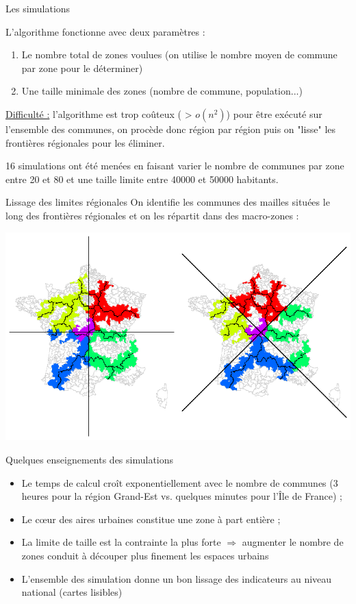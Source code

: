 \documentclass[11pt]{beamer}
\begin{document}
\begin{frame}{Les simulations}

L'algorithme fonctionne avec deux paramètres :
\begin{enumerate}
\item Le nombre total de zones voulues (on utilise le nombre moyen de commune par zone pour le déterminer)
\item Une taille minimale des zones (nombre de commune, population...)
\end{enumerate}
\vspace{.2cm}
\underline{Difficulté :} l'algorithme est trop coûteux ( > $o(n^2)$) pour être exécuté sur l'ensemble des communes, on procède donc région par région puis on "lisse" les frontières régionales pour les éliminer.

\vspace{.2cm}

16 simulations ont été menées en faisant varier le nombre de communes par zone entre 20 et 80 et une taille limite entre 40000 et 50000 habitants.
\end{frame}

\begin{frame}{Lissage des limites régionales}
On identifie les communes des mailles situées le long des frontières régionales et on les répartit dans des macro-zones :
\begin{center}
\includegraphics[scale=.5]{img/Methodo_decoupage}
\end{center}
\end{frame}


\begin{frame}{Quelques enseignements des simulations}
\begin{itemize}
\item Le temps de calcul croît exponentiellement avec le nombre de communes (3 heures pour la région Grand-Est vs. quelques minutes pour l'Île de France) ;
\item Le c\oe ur des aires urbaines constitue une zone à part entière ;
\item La limite de taille est la contrainte la plus forte $\Rightarrow$ augmenter le nombre de zones conduit à découper plus finement les espaces urbains
\item L'ensemble des simulation donne un bon lissage des indicateurs au niveau national (cartes lisibles)
\end{itemize}
\end{frame}
\end{document}
